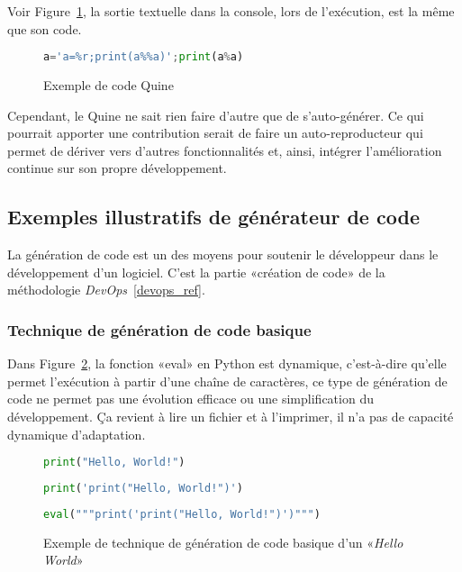 Voir Figure~\ref{fig:exemple_quine}, la sortie textuelle dans la console, lors de l'exécution, est la même que son code.

\begin{figure}
\begin{lstlisting}[language=Python]
a='a=%r;print(a%%a)';print(a%a)
\end{lstlisting}
\caption{Exemple de code Quine}
\label{fig:exemple_quine}
\end{figure}

Cependant, le Quine ne sait rien faire d’autre que de s’auto-générer. Ce qui pourrait apporter une contribution serait de faire un auto-reproducteur qui permet de dériver vers d’autres fonctionnalités et, ainsi, intégrer l’amélioration continue sur son propre développement.

\subsection{Exemples illustratifs de générateur de code}

La génération de code est un des moyens pour soutenir le développeur dans le développement d’un logiciel. C’est la partie «création de code» de la méthodologie \textit{DevOps}~\ref{devops_ref}.

\subsubsection{Technique de génération de code basique}

Dans Figure~\ref{fig:exemple_gen_code_basique}, la fonction «eval» en Python est dynamique, c'est-à-dire qu’elle permet l’exécution à partir d’une chaîne de caractères, ce type de génération de code ne permet pas une évolution efficace ou une simplification du développement. Ça revient à lire un fichier et à l'imprimer, il n’a pas de capacité dynamique d’adaptation.

\begin{figure}
\begin{lstlisting}[language=Python, upquote=true, caption={C de Figure~\ref{fig:exemple_gen_code_basique}}, label={lst:gen_code_basique_c}]
print("Hello, World!")
\end{lstlisting}

\begin{lstlisting}[language=Python, upquote=true, caption={µ$_C$ de Figure~\ref{fig:exemple_gen_code_basique}}, label={lst:gen_code_basique_uc}]
print('print("Hello, World!")')
\end{lstlisting}

\begin{lstlisting}[language=Python, upquote=true, caption={M(µ$_C$) de Figure~\ref{fig:exemple_gen_code_basique}}, label={lst:gen_code_basique_m}]
eval("""print('print("Hello, World!")')""")
\end{lstlisting}
\caption{Exemple de technique de génération de code basique d'un «\textit{Hello World}»}
\label{fig:exemple_gen_code_basique}
\end{figure}

